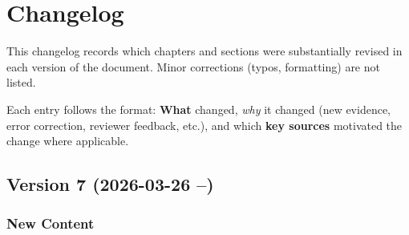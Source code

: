 \chapter*{Changelog}

This changelog records which chapters and sections were substantially revised
in each version of the document. Minor corrections (typos, formatting) are not
listed.

Each entry follows the format: \textbf{What} changed, \textit{why} it changed
(new evidence, error correction, reviewer feedback, etc.), and which
\textbf{key sources} motivated the change where applicable.

\section*{Version 7 (2026-03-26 --)}

\subsection*{New Content}

